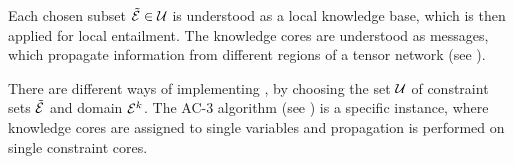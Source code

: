 Each chosen subset $\tilde{\mathcal{E}}\in\mathcal{U}$ is understood as a local knowledge base, which is then applied for local entailment.
The knowledge cores are understood as messages, which propagate information from different regions of a tensor network (see ).

There are different ways of implementing , by choosing the set $\mathcal{U}$ of constraint sets $\tilde{\mathcal{E}}$ and domain $\mathcal{E}^{k}$. %
The AC-3 algorithm (see \cite{mackworth_consistency_1977}) is a specific instance, where knowledge cores are assigned to single variables and propagation is performed on single constraint cores.


